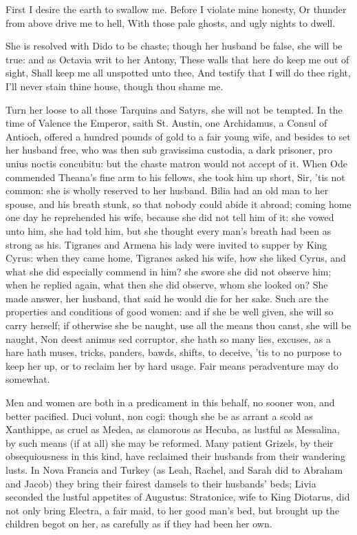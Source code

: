 {First I desire the earth to swallow me.
Before I violate mine honesty,
Or thunder from above drive me to hell,
With those pale ghosts, and ugly nights to dwell.

She is resolved with Dido to be chaste; though her husband be false,
she will be true: and as Octavia writ to her Antony,
These walls that here do keep me out of sight,
Shall keep me all unspotted unto thee,
And testify that I will do thee right,
I'll never stain thine house, though thou shame me.

Turn her loose to all those Tarquins and Satyrs, she will not be
tempted. In the time of Valence the Emperor, saith St. Austin,
one Archidamus, a Consul of Antioch, offered a hundred pounds of gold
to a fair young wife, and besides to set her husband free, who was then
sub gravissima custodia, a dark prisoner, pro unius noctis concubitu:
but the chaste matron would not accept of it. When Ode commended
Theana's fine arm to his fellows, she took him up short, Sir, 'tis not
common: she is wholly reserved to her husband. Bilia had an old
man to her spouse, and his breath stunk, so that nobody could abide it
abroad; coming home one day he reprehended his wife, because she did
not tell him of it: she vowed unto him, she had told him, but she
thought every man's breath had been as strong as his. Tigranes
and Armena his lady were invited to supper by King Cyrus: when they
came home, Tigranes asked his wife, how she liked Cyrus, and what she
did especially commend in him? she swore she did not observe him; when
he replied again, what then she did observe, whom she looked on? She
made answer, her husband, that said he would die for her sake. Such are
the properties and conditions of good women: and if she be well given,
she will so carry herself; if otherwise she be naught, use all the
means thou canst, she will be naught, Non deest animus sed corruptor,
she hath so many lies, excuses, as a hare hath muses, tricks, panders,
bawds, shifts, to deceive, 'tis to no purpose to keep her up, or to
reclaim her by hard usage. Fair means peradventure may do somewhat.

  Men and women are both in a
predicament in this behalf, no sooner won, and better pacified. Duci
volunt, non cogi: though she be as arrant a scold as Xanthippe, as
cruel as Medea, as clamorous as Hecuba, as lustful as Messalina, by
such means (if at all) she may be reformed. Many patient Grizels,
by their obsequiousness in this kind, have reclaimed their husbands
from their wandering lusts. In Nova Francia and Turkey (as Leah,
Rachel, and Sarah did to Abraham and Jacob) they bring their fairest
damsels to their husbands' beds; Livia seconded the lustful appetites
of Augustus: Stratonice, wife to King Diotarus, did not only bring
Electra, a fair maid, to her good man's bed, but brought up the
children begot on her, as carefully as if they had been her own.

}
